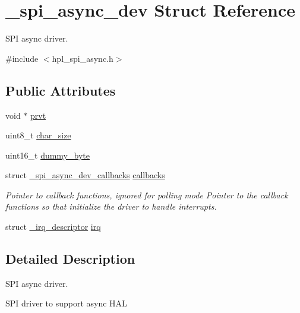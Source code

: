 \hypertarget{struct__spi__async__dev}{}\section{\+\_\+spi\+\_\+async\+\_\+dev Struct Reference}
\label{struct__spi__async__dev}


S\+PI async driver.  




{\ttfamily \#include $<$hpl\+\_\+spi\+\_\+async.\+h$>$}

\subsection*{Public Attributes}
\begin{DoxyCompactItemize}
\item 
void $\ast$ \hyperlink{struct__spi__async__dev_adddb2a5d834ec5253bf566168107f56a}{prvt}
\item 
uint8\+\_\+t \hyperlink{struct__spi__async__dev_ac63f49229f0a88031004fe565d95ceca}{char\+\_\+size}
\item 
uint16\+\_\+t \hyperlink{struct__spi__async__dev_aa19bf608cb83f4172d6b219d0e328085}{dummy\+\_\+byte}
\item 
\mbox{\label{struct__spi__async__dev_a908ae4b41c8249c00262f6f351fc60f4}} 
struct \hyperlink{struct__spi__async__dev__callbacks}{\+\_\+spi\+\_\+async\+\_\+dev\+\_\+callbacks} \hyperlink{struct__spi__async__dev_a908ae4b41c8249c00262f6f351fc60f4}{callbacks}
\begin{DoxyCompactList}\small\item\em Pointer to callback functions, ignored for polling mode Pointer to the callback functions so that initialize the driver to handle interrupts. \end{DoxyCompactList}\item 
struct \hyperlink{struct__irq__descriptor}{\+\_\+irq\+\_\+descriptor} \hyperlink{struct__spi__async__dev_ab24c9b89754b904df98818975cbf091f}{irq}
\end{DoxyCompactItemize}


\subsection{Detailed Description}
S\+PI async driver. 

S\+PI driver to support async H\+AL 

